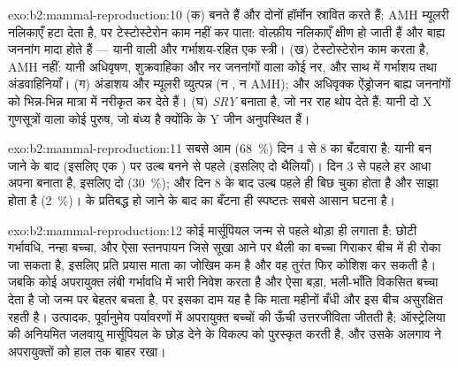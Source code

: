 \begin{solution}{exo:b2:mammal-reproduction:10}
(क)  बनते हैं और दोनों हॉर्मोन स्रावित करते हैं; AMH म्यूलरी
नलिकाएँ हटा देता है, पर टेस्टोस्टेरोन काम नहीं कर पाता: वोल्फ़ीय
नलिकाएँ क्षीण हो जाती हैं और बाह्य जननांग मादा होते हैं --- यानी
 वाली और गर्भाशय-रहित एक स्त्री। (ख) टेस्टोस्टेरोन काम करता है,
AMH नहीं: यानी अधिवृषण, शुक्रवाहिका और नर जननांगों वाला कोई नर, और साथ
में गर्भाशय तथा अंडवाहिनियाँ। (ग)
अंडाशय और म्यूलरी व्युत्पन्न (न , न AMH); और अधिवृक्क
ऐंड्रोजन बाह्य जननांगों को भिन्न-भिन्न मात्रा में नरीकृत कर देते हैं। (घ)
\emph{SRY}  बनाता है, जो नर राह थोप देते हैं: यानी दो
X गुणसूत्रों वाला कोई पुरुष, जो बंध्य है क्योंकि  के Y जीन
अनुपस्थित हैं।
\end{solution}

\begin{solution}{exo:b2:mammal-reproduction:11}
सबसे आम (\qty{68}{\%}) दिन 4 से 8 का बँटवारा है: यानी
 बन जाने के बाद (इसलिए एक ) पर उल्ब बनने से पहले
(इसलिए दो थैलियाँ)। दिन 3 से पहले हर आधा अपना  बनाता है,
इसलिए दो  (\qty{30}{\%}); और दिन 8 के बाद उल्ब
पहले ही बिछ चुका होता है और साझा होता है (\qty{2}{\%})।  के
प्रतिबद्ध हो जाने के बाद  का बँटना ही स्पष्टतः
सबसे आसान घटना है।
\end{solution}

\begin{solution}{exo:b2:mammal-reproduction:12}
कोई मार्सूपियल जन्म से पहले थोड़ा ही लगाता है: छोटी गर्भावधि, नन्हा
बच्चा, और ऐसा स्तनपायन जिसे सूखा आने पर थैली का बच्चा गिराकर बीच में ही
रोका जा सकता है, इसलिए प्रति प्रयास माता का जोखिम कम है और
वह तुरंत फिर कोशिश कर सकती है। जबकि कोई अपरायुक्त लंबी
गर्भावधि में भारी निवेश करता है और ऐसा बड़ा, भली-भाँति विकसित बच्चा देता
है जो जन्म पर बेहतर बचता है, पर इसका दाम यह है कि माता महीनों बँधी और
इस बीच असुरक्षित रहती है। उत्पादक, पूर्वानुमेय पर्यावरणों में
अपरायुक्त बच्चों की ऊँची उत्तरजीविता जीतती है; ऑस्ट्रेलिया की अनियमित
जलवायु मार्सूपियल के छोड़ देने के विकल्प को पुरस्कृत करती है, और उसके
अलगाव ने अपरायुक्तों को हाल तक बाहर रखा।
\end{solution}

